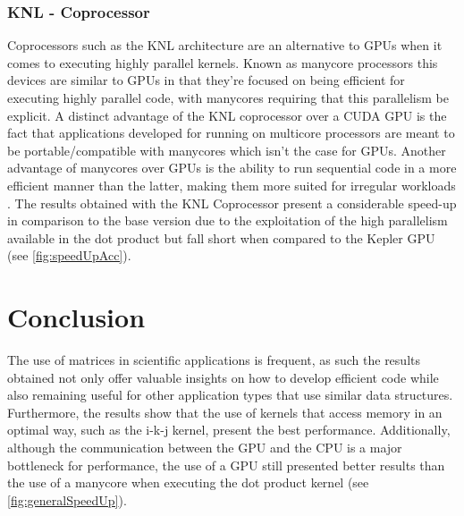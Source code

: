 \documentclass{article}
\begin{document}
\subsubsection{KNL - Coprocessor}
Coprocessors such as the KNL architecture are an alternative to GPUs when it comes to executing highly parallel kernels. Known as manycore processors this devices are 
similar to GPUs in that they're focused on being efficient for executing highly parallel code, with manycores requiring that this parallelism be explicit. A distinct 
advantage of the KNL coprocessor over a CUDA GPU is the fact that applications developed for running on multicore processors are meant to be portable/compatible with 
manycores which isn't the case for GPUs.
Another advantage of manycores over GPUs is the ability to run sequential code in a more efficient manner than the latter, making them more suited for irregular workloads \cite{xmt_gpu}. The results obtained with the KNL Coprocessor present a considerable speed-up in comparison to the base version due to the exploitation of the high parallelism available in the dot product but fall short when compared to the Kepler GPU (see \ref{fig:speedUpAcc}).

\section{Conclusion}
The use of matrices in scientific applications is frequent, as such the results obtained not only offer valuable insights on how to develop efficient code while also 
remaining useful for other application types that use similar data structures. Furthermore, the results show that the use of kernels that access memory in an optimal way, such as the i-k-j kernel, present the best performance. Additionally, although the communication between the GPU and the CPU is a major bottleneck for 
performance, the use of a GPU still presented better results than the use of a manycore when executing the dot product kernel (see \ref{fig:generalSpeedUp}). 

\printbibliography
\end{document}
